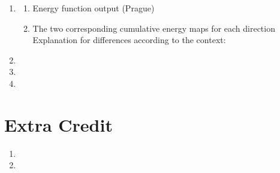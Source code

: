 \documentclass{article}
\begin{document}
\begin{enumerate}
	\item
	\begin{enumerate}
		\item Energy function output (Prague)
		\item The two corresponding cumulative energy maps for each direction \\
		Explanation for differences according to the context:
	\end{enumerate}
	\item 
	\item
	\item 
\end{enumerate}
\pagebreak

\label{Extra Credit}
\section{Extra Credit}
\begin{enumerate}
	\item
	\item 
\end{enumerate}
\end{document}
